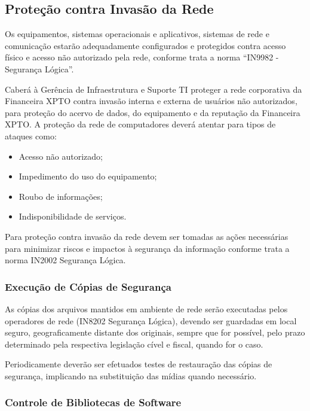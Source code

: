 \documentclass[a4paper,12pt]{article}
\begin{document}
\subsection{Proteção contra Invasão da Rede}

Os equipamentos, sistemas operacionais e aplicativos, sistemas de rede e comunicação estarão adequadamente configurados e protegidos contra acesso físico e acesso não autorizado pela rede, conforme trata a norma ``IN9982 - Segurança Lógica''.

Caberá à Gerência de Infraestrutura e Suporte TI proteger a rede corporativa da Financeira XPTO contra invasão interna e externa de usuários não autorizados, para proteção do acervo de dados, do equipamento e da reputação da Financeira XPTO. A proteção da rede de computadores deverá atentar para tipos de ataques como:

\begin{itemize}
    \item Acesso não autorizado;
    \item Impedimento do uso do equipamento;
    \item Roubo de informações;
    \item Indisponibilidade de serviços.
\end{itemize}

Para proteção contra invasão da rede devem ser tomadas as ações necessárias para minimizar riscos e impactos à segurança da informação conforme trata a norma IN2002 Segurança Lógica.

\subsubsection{Execução de Cópias de Segurança}

As cópias dos arquivos mantidos em ambiente de rede serão executadas pelos operadores de rede (IN8202 Segurança Lógica), devendo ser guardadas em local seguro, geograficamente distante dos originais, sempre que for possível, pelo prazo determinado pela respectiva legislação cível e fiscal, quando for o caso.

Periodicamente deverão ser efetuados testes de restauração das cópias de segurança, implicando na substituição das mídias quando necessário.

\subsubsection{Controle de Bibliotecas de Software}
\end{document}
